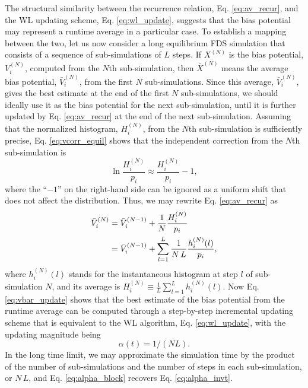 \documentclass[reprint, superscriptaddress, floatfix]{revtex4-1}
\begin{document}
The structural similarity between the recurrence relation,
Eq. \eqref{eq:av_recur},
and the WL updating scheme, Eq. \eqref{eq:wl_update},
suggests that the bias potential may represent
a runtime average in a particular case.
%
To establish a mapping between the two,
let us now consider a long equilibrium FDS simulation
that consists of a sequence of sub-simulations
of $L$ steps.
%
If $X^{(N)}$ is
the bias potential, $V_i^{(N)}$, computed
from the $N$th sub-simulation,
then ${\bar X}^{(N)}$ means the average bias potential,
${\bar V}_i^{(N)}$,
from the first $N$ sub-simulations.
%
Since this average, ${\bar V}_i^{(N)}$,
gives the best estimate at the end of
the first $N$ sub-simulations,
we should ideally use it as the bias potential
for the next sub-simulation,
until it is further updated by Eq. \eqref{eq:av_recur}
at the end of the next sub-simulation.
%
Assuming that the normalized histogram, $H_i^{(N)}$,
from the $N$th sub-simulation is sufficiently precise,
Eq. \eqref{eq:vcorr_equil}
shows that the independent
correction from the $N$th sub-simulation is
%
\begin{equation*}
  \ln \frac{ H_i^{(N)} } { p_i }
  \approx
  \frac{ H_i^{(N)} } { p_i } - 1
  ,
\end{equation*}
%
where the ``$-1$'' on the right-hand side
can be ignored as a uniform shift
that does not affect the distribution.
%
Thus, we may rewrite Eq. \eqref{eq:av_recur} as
\begin{align}
  {\bar V}_i^{(N)}
  &=
  {\bar V}_i^{(N-1)}
  +
  \frac{1}{N} \frac{ H_i^{(N)} }{ p_i }
  \notag
  \\
  &=
  {\bar V}_i^{(N-1)}
  +
  \sum_{l=1}^L \frac{1}{N \, L} \frac{ h_i^{(N)}(l) }{ p_i }
  ,
  \label{eq:vbar_update}
\end{align}
%
where $h_i^{(N)}(l)$ stands for the instantaneous histogram
at step $l$ of sub-simulation $N$,
and its average is
$H_i^{(N)} \equiv \frac{1}{L} \sum_{l=1}^L h_i^{(N)}(l)$.
%
Now Eq. \eqref{eq:vbar_update} shows that the best estimate
of the bias potential from the runtime average can be computed
through a step-by-step incremental updating scheme that is equivalent to
the WL algorithm, Eq. \eqref{eq:wl_update},
with the updating magnitude being
%
\begin{equation}
  \alpha(t) = 1/(NL)
  .
  \label{eq:alpha_block}
\end{equation}
%
In the long time limit,
we may approximate the simulation time
by the product of the number of sub-simulations
and the number of steps in each sub-simulation, or $N \, L$,
%
and Eq. \eqref{eq:alpha_block} recovers Eq. \eqref{eq:alpha_invt}.
\end{document}
